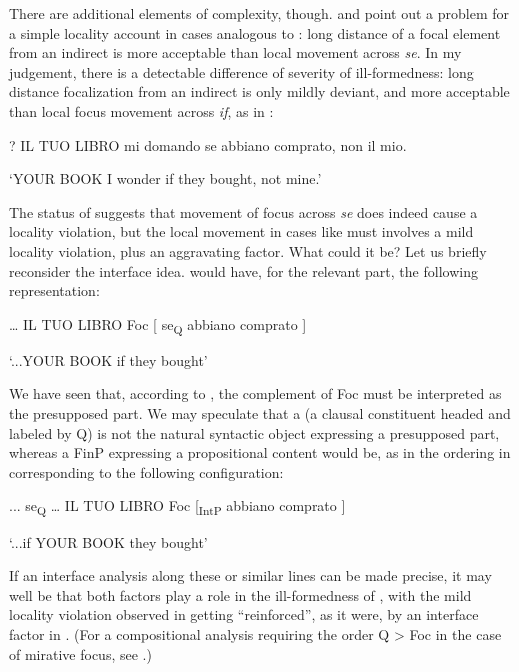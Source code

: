 \documentclass[output=paper]{LSP/langsci}
\begin{document}
There are additional elements of complexity, though. \citet{Callegari2014} and  \citet{CinqueKrapova2013} point out a problem for a simple locality account in cases analogous to : long distance  of a focal element from an indirect  is more acceptable than local movement across \textit{se}. In my judgement, there is a detectable difference of severity of ill-formedness: long distance focalization from an indirect  is only mildly deviant, and more acceptable than local focus movement across \textit{if}, as in :

\ea%
    \label{ex:rizzi:10}
  ? IL TUO LIBRO mi domando se abbiano comprato, non il mio.

\glt ‘YOUR BOOK I wonder if they bought, not mine.’
\z

The status of  suggests that movement of focus across \textit{se} does indeed cause a locality violation, but the local movement in cases like  must involves a mild locality violation, plus an aggravating factor. What could it be? Let us briefly reconsider the interface idea.   would have, for the relevant part, the following representation:

\ea%
    \label{ex:rizzi:11}
     … IL TUO LIBRO Foc [ se\textsubscript{Q} abbiano comprato ]

     \glt ‘...YOUR BOOK            if they bought'
\z

We have seen that, according to , the complement of Foc must be interpreted as the presupposed part. We may speculate that a  (a clausal constituent headed and labeled by Q) is not the natural syntactic object expressing a presupposed part, whereas a FinP expressing a propositional content would be, as in the ordering in   corresponding to the following configuration:

\ea%
    \label{ex:rizzi:12}
   ... se\textsubscript{Q}    … IL TUO LIBRO Foc [\textsubscript{IntP} abbiano comprato ]

    \glt ‘...if             YOUR BOOK                    they bought’
\z

If an interface analysis along these or similar lines can be made precise, it may well be that both factors play a role in the ill-formedness of , with the mild locality violation observed in  getting “reinforced”, as it were, by an interface factor in . (For a compositional analysis requiring the order Q > Foc in the case of mirative focus, see \citealt{BianchiEtAl2015}.) 
\end{document}
